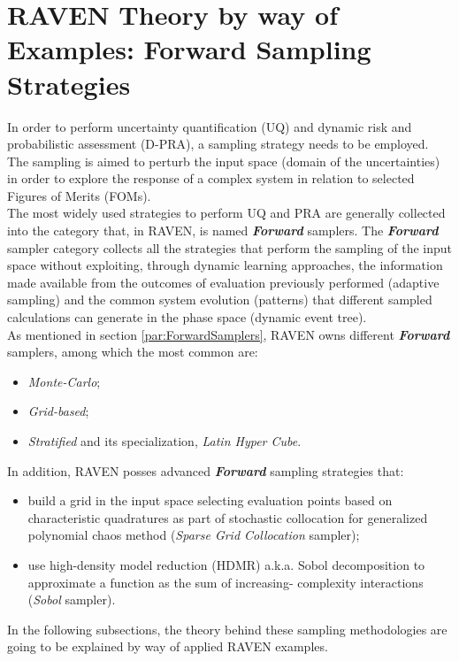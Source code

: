 \section{RAVEN Theory by way of Examples: Forward Sampling Strategies}
In order to perform uncertainty quantification (UQ) and dynamic risk and
probabilistic assessment (D-PRA),
a sampling strategy needs to be employed. The sampling is aimed to
perturb the input space (domain of the uncertainties) in order to explore
the response of a complex system in relation to selected Figures of 
Merits (FOMs). 
\\The most widely used strategies to perform UQ and PRA are generally
collected into the category that, in RAVEN, is named \textit{\textbf{Forward}} samplers. The \textit{\textbf{Forward}} sampler category collects all the strategies that perform the sampling of the input space without exploiting, through dynamic learning approaches, the information made available from the outcomes of evaluation previously performed (adaptive sampling) and the common system evolution (patterns) that different sampled calculations can generate in the phase space (dynamic event tree). 
\\As mentioned in section \ref{par:ForwardSamplers}, RAVEN owns
different \textit{\textbf{Forward}} samplers, among which the most 
common are:
\begin{itemize}
  \item \textit{Monte-Carlo};
  \item \textit{Grid-based};
  \item \textit{Stratified} and its specialization, \textit{Latin Hyper Cube}.
\end{itemize}
In addition, RAVEN posses advanced \textit{\textbf{Forward}} sampling strategies that:
\begin{itemize}
  \item build a grid in the input space selecting evaluation points 
  based on characteristic quadratures as part of stochastic collocation 
  for generalized polynomial chaos method (\textit{Sparse 
  Grid Collocation} sampler);
  \item use high-density model reduction (HDMR) a.k.a. Sobol 
  decomposition to approximate a function as the sum of increasing-
  complexity interactions (\textit{Sobol} sampler).
\end{itemize} 
In the following subsections, the theory behind these sampling 
methodologies are going to be explained by way of applied RAVEN 
examples.

